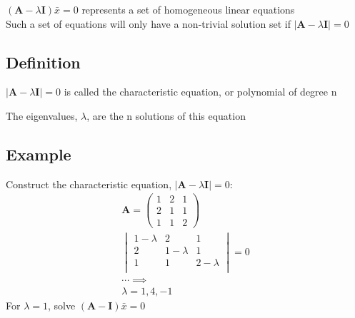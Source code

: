 \documentclass[a4paper, 11pt, normalem]{report}
\begin{document}
$(\mathbf{A} - \lambda\mathbf{I})\bar{x} = 0$ represents a set of homogeneous linear equations \\
Such a set of equations will only have a non-trivial solution set if $|\mathbf{A} - \lambda\mathbf{I}| = 0$

\subsection{Definition}
$|\mathbf{A} - \lambda\mathbf{I}| = 0$ is called the characteristic equation, or polynomial of degree n

The eigenvalues, $\lambda$, are the n solutions of this equation

\subsection{Example}
Construct the characteristic equation, $|\mathbf{A} - \lambda\mathbf{I}| = 0$:
\begin{gather*}
    \mathbf{A} =
    \begin{pmatrix}
        1 & 2 & 1 \\
        2 & 1 & 1 \\
        1 & 1 & 2
    \end{pmatrix} \\
    \begin{vmatrix}
        1 - \lambda &           2 &           1 \\
                  2 & 1 - \lambda &           1 \\
                  1 &           1 & 2 - \lambda \\
    \end{vmatrix} = 0 \\
    \cdots \implies \\
    \lambda = 1,4,-1
\end{gather*}
For $\lambda = 1$, solve $(\mathbf{A} - \mathbf{I})\bar{x} = 0$
\end{document}

